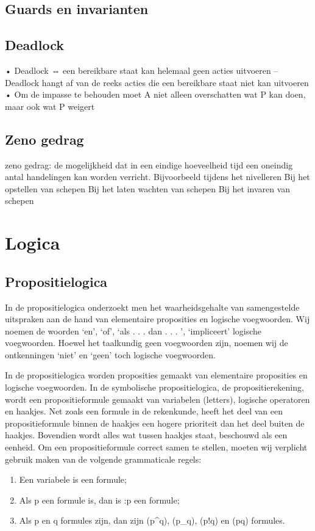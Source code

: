 \documentclass{article}
\begin{document}
	\subsection{Guards en invarianten}
	
 
	
	
	\subsection{Deadlock}
	• Deadlock ⇔ een bereikbare staat kan helemaal geen acties uitvoeren – Deadlock hangt af van de reeks acties die een bereikbare staat niet kan uitvoeren • Om de impasse te behouden moet A niet alleen overschatten wat P kan doen, maar ook wat P weigert
	\subsection{Zeno gedrag}
	zeno gedrag: de mogelijkheid dat in een eindige hoeveelheid tijd een oneindig antal handelingen kan worden verricht.
	Bijvoorbeeld tijdens het nivelleren
	Bij het opstellen van schepen
	Bij het laten wachten van schepen
	Bij het invaren van schepen
	
	\section{Logica}
	
	
	
	\subsection{Propositielogica}
	
	
	In de propositielogica onderzoekt men het waarheidsgehalte van samengestelde uitspraken
	aan de hand van elementaire proposities en logische voegwoorden. Wij noemen de
	woorden ‘en’, ‘of’, ‘als . . . dan . . . ’, ‘impliceert’ logische voegwoorden. Hoewel het taalkundig
	geen voegwoorden zijn, noemen wij de ontkenningen ‘niet’ en ‘geen’ toch logische
	voegwoorden.
	
	In de propositielogica worden proposities gemaakt van elementaire proposities en logische
	voegwoorden. In de symbolische propositielogica, de propositierekening, wordt een
	propositieformule gemaakt van variabelen (letters), logische operatoren en haakjes. Net
	zoals een formule in de rekenkunde, heeft het deel van een propositieformule binnen de
	haakjes een hogere prioriteit dan het deel buiten de haakjes. Bovendien wordt alles wat
	tussen haakjes staat, beschouwd als een eenheid. Om een propositieformule correct samen
	te stellen, moeten wij verplicht gebruik maken van de volgende grammaticale regels:
	\begin{enumerate}
		\item Een variabele is een formule;
		\item Als p een formule is, dan is :p een formule;
		\item Als p en q formules zijn, dan zijn (p^q), (p_q), (p!q) en (p\text{$}q) formules.
	\end{enumerate}
	
\end{document}
